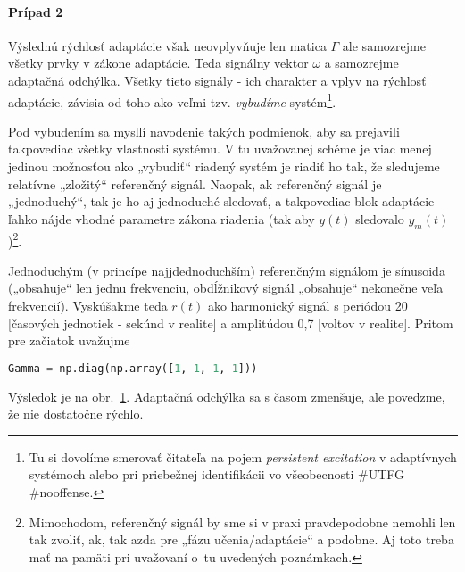 \documentclass[a4paper, 10pt, ]{article}
\begin{document}
\paragraph{Prípad 2}

Výslednú rýchlosť adaptácie však neovplyvňuje len matica $\Gamma$ ale samozrejme všetky prvky v zákone adaptácie. Teda signálny vektor $\omega$ a samozrejme adaptačná odchýlka. Všetky tieto signály - ich charakter a vplyv na rýchlosť adaptácie, závisia od toho ako veľmi tzv. \emph{vybudíme} systém\footnote{Tu si dovolíme smerovať čitateľa na pojem \emph{persistent excitation} v adaptívnych systémoch alebo pri priebežnej identifikácii vo všeobecnosti \#UTFG \#nooffense.}.


Pod vybudením sa mysllí navodenie takých podmienok, aby sa prejavili takpovediac všetky vlastnosti systému. V tu uvažovanej schéme je viac menej jedinou možnosťou ako „vybudiť“ riadený systém je riadiť ho tak, že sledujeme relatívne „zložitý“ referenčný signál. Naopak, ak referenčný signál je „jednoduchý“, tak je ho aj jednoduché sledovať, a takpovediac blok adaptácie ľahko nájde vhodné parametre zákona riadenia (tak aby $y(t)$ sledovalo $y_m(t)$)\footnote{Mimochodom, referenčný signál by sme si v praxi pravdepodobne nemohli len tak zvoliť, ak, tak azda pre „fázu učenia/adaptácie“ a podobne. Aj toto treba mať na pamäti pri uvažovaní o~tu uvedených poznámkach.}.

Jednoduchým (v princípe najjdednoduchším) referenčným signálom je sínusoida („obsahuje“ len jednu frekvenciu, obdĺžnikový signál „obsahuje“ nekonečne veľa frekvencií). Vyskúšakme teda $r(t)$ ako harmonický signál s periódou 20 [časových jednotiek - sekúnd v realite] a amplitúdou 0,7 [voltov v realite]. Pritom pre začiatok uvažujme
\begin{lstlisting}[language=Python,
                    numbers=none,
                    ]
Gamma = np.diag(np.array([1, 1, 1, 1]))
\end{lstlisting}
Výsledok je na obr.~\ref{figsc_ar06_MRAC_3}. Adaptačná odchýlka sa s časom  zmenšuje, ale povedzme, že nie dostatočne rýchlo.






\begin{figure}[!b]
	\centering

    \vspace{-3mm}


    \vspace{-2mm}

	\caption{}
	\label{figsc_ar06_MRAC_3}


    \vspace{-2mm}

\end{figure}
\end{document}

